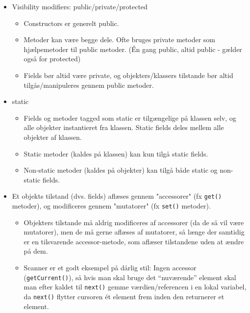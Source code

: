 \begin{itemize}
  \item Visibility modifiers: public/private/protected
  \begin{itemize}
    \item Constructors er generelt public.
    \item Metoder kan være begge dele. Ofte bruges private metoder som hjælpemetoder til public metoder. (Én gang public, altid public - gælder også for protected)
    \item Fields bør altid være private, og objekters/klassers tilstande bør altid tilgås/manipuleres gennem public metoder.
  \end{itemize}
  
  \item static
  \begin{itemize}
    \item Fields og metoder tagged som static er tilgængelige på klassen selv, og alle objekter instantieret fra klassen. Static fields deles mellem alle objekter af klassen.
    \item Static metoder (kaldes på klassen) kan kun tilgå static fields.
    \item Non-static metoder (kaldes på objekter) kan tilgå både static og non-static fields.
  \end{itemize}
  
  \item Et objekts tilstand (dvs. fields) aflæses gennem "accessorer" (fx \verb|get()| metoder), og modificeres gennem "mutatorer" (fx \verb|set()| metoder).
  \begin{itemize}
    \item Objekters tilstande må aldrig modificeres af accessorer (da de så vil være mutatorer), men de må gerne aflæses af mutatorer, så længe der samtidig er en tilsvarende accessor-metode, som aflæser tilstandene uden at ændre på dem.
    \item Scanner er et godt eksempel på dårlig stil: Ingen accessor (\verb|getCurrent()|), så hvis man skal bruge det “nuværende” element skal man efter kaldet til \verb|next()| gemme værdien/referencen i en lokal variabel, da \verb|next()| flytter cursoren ét element frem inden den returnerer et element.
  \end{itemize}
  

\end{itemize}
